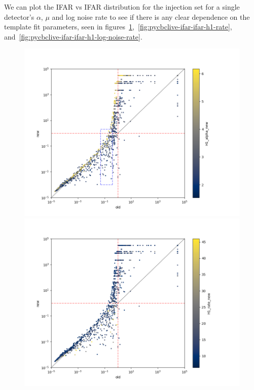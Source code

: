 We can plot the IFAR vs IFAR distribution for the injection set for a single detector's $\alpha$, $\mu$ and log noise rate to see if there is any clear dependence on the template fit parameters, seen in figures~\ref{fig:pycbclive-ifar-ifar-h1-alpha},~\ref{fig:pycbclive-ifar-ifar-h1-rate}, and~\ref{fig:pycbclive-ifar-ifar-h1-log-noise-rate}.
%
\begin{figure}
    \centering
    \begin{minipage}[t]{0.8\textwidth}
        \centering
        \vspace{-0.75cm}
        \includegraphics[width=\textwidth]{images/pycbclive/all_full_h1_alpha.png}
        \caption{}
        \label{fig:pycbclive-ifar-ifar-h1-alpha}
        \vspace{-0.95cm}
        \includegraphics[width=\textwidth]{images/pycbclive/all_full_h1_rate.png}

\end{minipage}
\end{figure}
